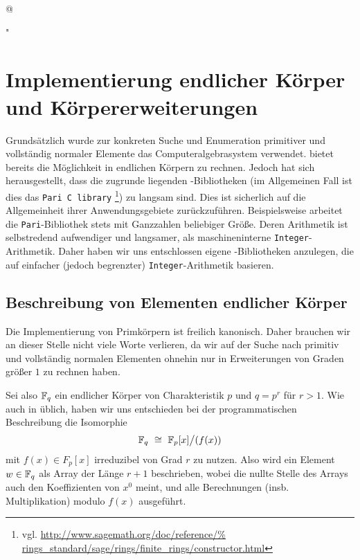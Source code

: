 \lstMakeShortInline[
  basicstyle = \small\normalfont\ttfamily,
  frame = none,
  numberstyle = \tiny,
  breaklines = true,
  escapeinside = {(*}{*)},
  tabsize=3,
  language=C,
  mathescape=true,
  breaklines=true]@

\lstMakeShortInline[
  basicstyle = \small\normalfont\ttfamily,
  frame = none,
  numberstyle = \tiny,
  breaklines = true,
  escapeinside = {(*}{*)},
  tabsize=3,
  language=Python,
  mathescape=true,
  breaklines=true]"


\section{Implementierung endlicher Körper und Körpererweiterungen}
\label{sec:impl_endl_körper}
Grundsätzlich wurde zur konkreten Suche und Enumeration primitiver und
vollständig normaler Elemente das Computeralgebrasystem \sage verwendet.
\sage bietet bereits die Möglichkeit in endlichen Körpern zu rechnen. Jedoch
hat sich herausgestellt, dass die zugrunde liegenden \Clang-Bibliotheken 
(im Allgemeinen Fall ist dies das \texttt{Pari C library}%
\footnote{vgl. \url{http://www.sagemath.org/doc/reference/%
rings_standard/sage/rings/finite_rings/constructor.html}}) 
zu langsam sind. Dies ist sicherlich auf die Allgemeinheit ihrer
Anwendungsgebiete zurückzuführen. Beispielsweise arbeitet die 
\texttt{Pari}-Bibliothek stets mit Ganzzahlen beliebiger Größe. Deren
Arithmetik ist selbstredend aufwendiger und langsamer, als maschineninterne
\texttt{Integer}-Arithmetik. Daher haben wir uns entschlossen eigene 
\Clang-Bibliotheken anzulegen, die auf einfacher (jedoch begrenzter) 
\texttt{Integer}-Arithmetik basieren.

\subsection{Beschreibung von Elementen endlicher Körper}
\label{sub:beschreibung_endliche_koerper}
Die Implementierung von Primkörpern ist freilich kanonisch. Daher brauchen wir
an dieser Stelle nicht viele Worte verlieren, da wir auf der Suche nach
primitiv und vollständig normalen Elementen ohnehin nur in Erweiterungen von
Graden größer $1$ zu rechnen haben.

Sei also $\mathbb{F}_q$ ein endlicher Körper von Charakteristik $p$ und $q = p^r$
für $r>1$.
Wie auch in \sage üblich, haben wir uns entschieden bei der programmatischen
Beschreibung die Isomorphie
\[ \mathbb{F}_q \ \cong\  \mathbb{F}_p[x] \big/ (f(x))\]
mit $f(x) \in F_p[x]$ irreduzibel von Grad $r$ zu nutzen. 
Also wird ein Element $w \in \mathbb{F}_q$ als Array der Länge $r+1$ beschrieben,
wobei die nullte Stelle des Arrays auch den Koeffizienten von $x^0$ meint, und
alle Berechnungen (insb. Multiplikation) modulo $f(x)$ ausgeführt.

